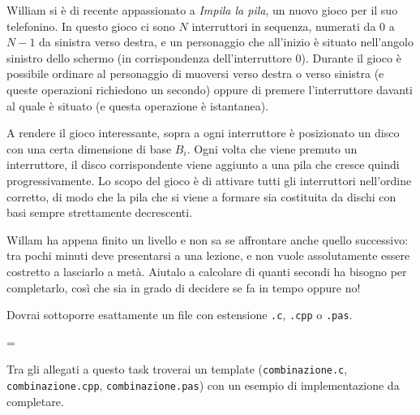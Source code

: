 \usepackage{xcolor}
\usepackage{afterpage}
\usepackage{pifont,mdframed}
\usepackage[bottom]{footmisc}

\makeatletter
\gdef\this@inputfilename{input.txt}
\gdef\this@outputfilename{output.txt}
\makeatother

\newcommand{\inputfile}{\texttt{input.txt}}
\newcommand{\outputfile}{\texttt{output.txt}}

\newenvironment{warning}
  {\par\begin{mdframed}[linewidth=2pt,linecolor=gray]%
    \begin{list}{}{\leftmargin=1cm
                   \labelwidth=\leftmargin}\item[\Large\ding{43}]}
  {\end{list}\end{mdframed}\par}

	William si è di recente appassionato a \emph{Impila la pila}, un nuovo gioco per il suo telefonino. In questo gioco ci sono $N$ interruttori in sequenza, numerati da $0$ a $N-1$ da sinistra verso destra, e un personaggio che all'inizio è situato nell'angolo sinistro dello schermo (in corrispondenza dell'interruttore $0$). Durante il gioco è possibile ordinare al personaggio di muoversi verso destra o verso sinistra (e queste operazioni richiedono un secondo) oppure di premere l'interruttore davanti al quale è situato (e questa operazione è istantanea).

	A rendere il gioco interessante, sopra a ogni interruttore è posizionato un disco con una certa dimensione di base $B_i$. Ogni volta che viene premuto un interruttore, il disco corrispondente viene aggiunto a una pila che cresce quindi progressivamente. Lo scopo del gioco è di attivare tutti gli interruttori nell'ordine corretto, di modo che la pila che si viene a formare sia costituita da dischi con basi sempre strettamente decrescenti.

	Willam ha appena finito un livello e non sa se affrontare anche quello successivo: tra pochi minuti deve presentarsi a una lezione, e non vuole assolutamente essere costretto a lasciarlo a metà. Aiutalo a calcolare di quanti secondi ha bisogno per completarlo, così che sia in grado di decidere se fa in tempo oppure no!

\Implementation
Dovrai sottoporre esattamente un file con estensione \texttt{.c}, \texttt{.cpp} o \texttt{.pas}.

\begin{warning}
Tra gli allegati a questo task troverai un template (\texttt{combinazione.c}, \texttt{combinazione.cpp}, \texttt{combinazione.pas}) con un esempio di implementazione da completare.
\end{warning}

